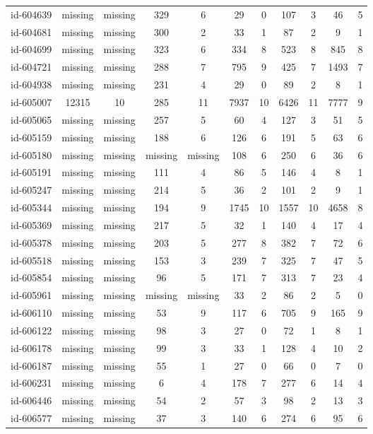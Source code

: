 \begin{tabular}{ccccccccccc}
id-604639 & missing & missing & 329 & 6 & 29 & 0 & 107 & 3 & 46 & 5\\
id-604681 & missing & missing & 300 & 2 & 33 & 1 & 87 & 2 & 9 & 1\\
id-604699 & missing & missing & 323 & 6 & 334 & 8 & 523 & 8 & 845 & 8\\
id-604721 & missing & missing & 288 & 7 & 795 & 9 & 425 & 7 & 1493 & 7\\
id-604938 & missing & missing & 231 & 4 & 29 & 0 & 89 & 2 & 8 & 1\\
id-605007 & 12315 & 10 & 285 & 11 & 7937 & 10 & 6426 & 11 & 7777 & 9\\
id-605065 & missing & missing & 257 & 5 & 60 & 4 & 127 & 3 & 51 & 5\\
id-605159 & missing & missing & 188 & 6 & 126 & 6 & 191 & 5 & 63 & 6\\
id-605180 & missing & missing & missing & missing & 108 & 6 & 250 & 6 & 36 & 6\\
id-605191 & missing & missing & 111 & 4 & 86 & 5 & 146 & 4 & 8 & 1\\
id-605247 & missing & missing & 214 & 5 & 36 & 2 & 101 & 2 & 9 & 1\\
id-605344 & missing & missing & 194 & 9 & 1745 & 10 & 1557 & 10 & 4658 & 8\\
id-605369 & missing & missing & 217 & 5 & 32 & 1 & 140 & 4 & 17 & 4\\
id-605378 & missing & missing & 203 & 5 & 277 & 8 & 382 & 7 & 72 & 6\\
id-605518 & missing & missing & 153 & 3 & 239 & 7 & 325 & 7 & 47 & 5\\
id-605854 & missing & missing & 96 & 5 & 171 & 7 & 313 & 7 & 23 & 4\\
id-605961 & missing & missing & missing & missing & 33 & 2 & 86 & 2 & 5 & 0\\
id-606110 & missing & missing & 53 & 9 & 117 & 6 & 705 & 9 & 165 & 9\\
id-606122 & missing & missing & 98 & 3 & 27 & 0 & 72 & 1 & 8 & 1\\
id-606178 & missing & missing & 99 & 3 & 33 & 1 & 128 & 4 & 10 & 2\\
id-606187 & missing & missing & 55 & 1 & 27 & 0 & 66 & 0 & 7 & 0\\
id-606231 & missing & missing & 6 & 4 & 178 & 7 & 277 & 6 & 14 & 4\\
id-606446 & missing & missing & 54 & 2 & 57 & 3 & 98 & 2 & 13 & 3\\
id-606577 & missing & missing & 37 & 3 & 140 & 6 & 274 & 6 & 95 & 6\\

\end{tabular}
